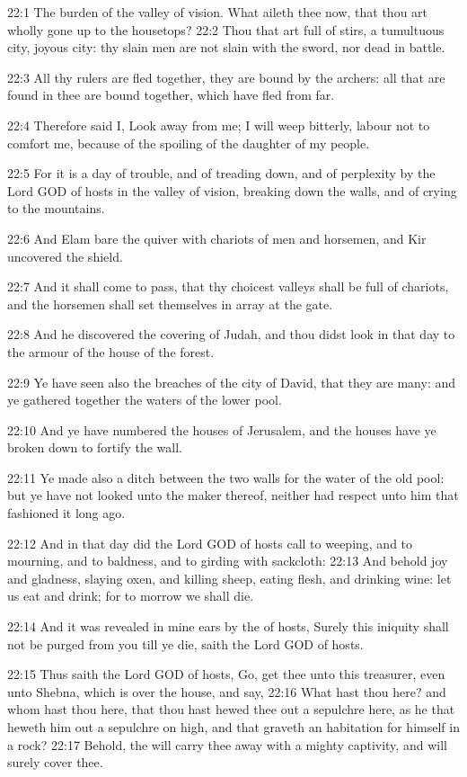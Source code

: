 22:1 The burden of the valley of vision. What aileth thee now, that
thou art wholly gone up to the housetops?  22:2 Thou that art full of
stirs, a tumultuous city, joyous city: thy slain men are not slain
with the sword, nor dead in battle.

22:3 All thy rulers are fled together, they are bound by the archers:
all that are found in thee are bound together, which have fled from
far.

22:4 Therefore said I, Look away from me; I will weep bitterly, labour
not to comfort me, because of the spoiling of the daughter of my
people.

22:5 For it is a day of trouble, and of treading down, and of
perplexity by the Lord GOD of hosts in the valley of vision, breaking
down the walls, and of crying to the mountains.

22:6 And Elam bare the quiver with chariots of men and horsemen, and
Kir uncovered the shield.

22:7 And it shall come to pass, that thy choicest valleys shall be
full of chariots, and the horsemen shall set themselves in array at
the gate.

22:8 And he discovered the covering of Judah, and thou didst look in
that day to the armour of the house of the forest.

22:9 Ye have seen also the breaches of the city of David, that they
are many: and ye gathered together the waters of the lower pool.

22:10 And ye have numbered the houses of Jerusalem, and the houses
have ye broken down to fortify the wall.

22:11 Ye made also a ditch between the two walls for the water of the
old pool: but ye have not looked unto the maker thereof, neither had
respect unto him that fashioned it long ago.

22:12 And in that day did the Lord GOD of hosts call to weeping, and
to mourning, and to baldness, and to girding with sackcloth: 22:13 And
behold joy and gladness, slaying oxen, and killing sheep, eating
flesh, and drinking wine: let us eat and drink; for to morrow we shall
die.

22:14 And it was revealed in mine ears by the \LORD of hosts, Surely
this iniquity shall not be purged from you till ye die, saith the Lord
GOD of hosts.

22:15 Thus saith the Lord GOD of hosts, Go, get thee unto this
treasurer, even unto Shebna, which is over the house, and say, 22:16
What hast thou here? and whom hast thou here, that thou hast hewed
thee out a sepulchre here, as he that heweth him out a sepulchre on
high, and that graveth an habitation for himself in a rock?  22:17
Behold, the \LORD will carry thee away with a mighty captivity, and
will surely cover thee.


